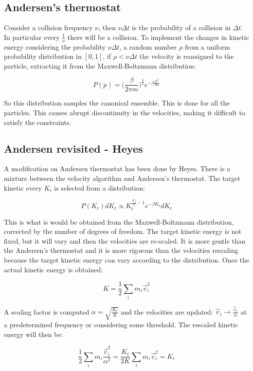 	\subsection{Andersen's thermostat}
	Consider a collision frequency $\nu$, then $\nu\Delta t$ is the probability of a collision in $\Delta t$.
	In particular every $\frac{1}{\nu}$ there will be a collision.
	To implement the changes in kinetic energy considering the probability $\nu\Delta t$, a random number $\rho$ from a uniform probability distribution in $[0,1]$, if $\rho<\nu\Delta t$ the velocity is reassigned to the particle, extracting it from the Maxwell-Boltzmann distribution:

	$$P(p) = \biggl(\frac{\beta}{2\pi m}\biggr)^{\frac{3}{2}}e^{-\beta\frac{p^2}{2m}}$$

	So this distribution samples the canonical ensemble.
	This is done for all the particles.
	This causes abrupt discontinuity in the velocities, making it difficult to satisfy the constraints.

	\subsection{Andersen revisited - Heyes}
	A modification on Andersen thermostat has been done by Heyes.
	There is a mixture between the velocity algorithm and Andersen's thermostat.
	The target kinetic every $K_t$ is selected from a distribution:

	$$P(K_t)dK_t\propto K_t^{\frac{N_f}{2}-1}e^{-\beta K_t}d K_t$$

	This is what is would be obtained from the Maxwell-Boltzmann distribution, corrected by the number of degrees of freedom.
	The target kinetic energy is not fixed, but it will vary and then the velocities are re-scaled.
	It is more gentle than the Andersen's thermostat and it is more rigorous than the velocities rescaling because the target kinetic energy can vary according to the distribution.
	Once the actual kinetic energy is obtained:

	$$K = \frac{1}{2}\sum\limits_im_i\vec{v}_i^2$$

	A scaling factor is computed $\alpha = \sqrt{\frac{K_t}{K}}$ and the velocities are updated: $\vec{v}_i \rightarrow \frac{\vec{v}_i}{\alpha}$ at a predetermined frequency or considering some threshold.
	The rescaled kinetic energy will then be:

	$$\frac{1}{2}\sum\limits_{i}m_i\frac{\vec{v}_i^2}{\alpha^2} = \frac{K_t}{2K}\sum\limits_{i}m_i\vec{v}_i^2 = K_t$$

